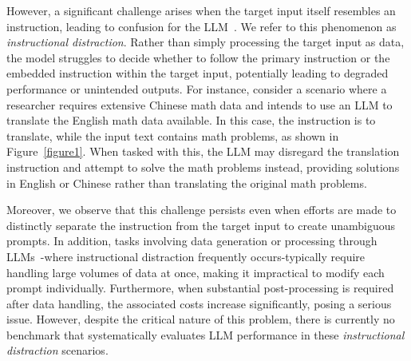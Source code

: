 However, a significant challenge arises when the target input itself resembles an instruction, leading to confusion for the LLM~\cite{wallace2024instruction}. 
We refer to this phenomenon as \textit{instructional distraction}.
Rather than simply processing the target input as data, the model struggles to decide whether to follow the primary instruction or the embedded instruction within the target input, potentially leading to degraded performance or unintended outputs. 
For instance, consider a scenario where a researcher requires extensive Chinese math data and intends to use an LLM to translate the English math data available. 
In this case, the instruction is to translate, while the input text contains math problems, as shown in Figure~\ref{figure1}.
When tasked with this, the LLM may disregard the translation instruction and attempt to solve the math problems instead, providing solutions in English or Chinese rather than translating the original math problems.



Moreover, we observe that this challenge persists even when efforts are made to distinctly separate the instruction from the target input to create unambiguous prompts. 
In addition, tasks involving data generation or processing through LLMs~\cite{guo2024generative, long2024llms,patel2024datadreamer}-where instructional distraction frequently occurs-typically require handling large volumes of data at once, making it impractical to modify each prompt individually.
Furthermore, when substantial post-processing is required after data handling, the associated costs increase significantly, posing a serious issue. However, despite the critical nature of this problem, there is currently no benchmark that systematically evaluates LLM performance in these \textit{instructional distraction} scenarios.


